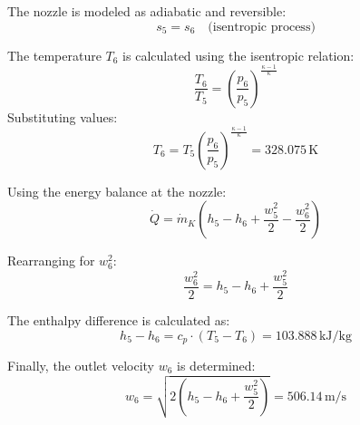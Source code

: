 The nozzle is modeled as adiabatic and reversible:  
\[
s_5 = s_6 \quad \text{(isentropic process)}  
\]  

The temperature \( T_6 \) is calculated using the isentropic relation:  
\[
\frac{T_6}{T_5} = \left( \frac{p_6}{p_5} \right)^{\frac{\kappa - 1}{\kappa}}  
\]  
Substituting values:  
\[
T_6 = T_5 \left( \frac{p_6}{p_5} \right)^{\frac{\kappa - 1}{\kappa}} = 328.075 \, \text{K}  
\]  

Using the energy balance at the nozzle:  
\[
\dot{Q} = \dot{m}_K \left( h_5 - h_6 + \frac{w_5^2}{2} - \frac{w_6^2}{2} \right)  
\]  

Rearranging for \( w_6^2 \):  
\[
\frac{w_6^2}{2} = h_5 - h_6 + \frac{w_5^2}{2}  
\]  

The enthalpy difference is calculated as:  
\[
h_5 - h_6 = c_p \cdot (T_5 - T_6) = 103.888 \, \text{kJ/kg}  
\]  

Finally, the outlet velocity \( w_6 \) is determined:  
\[
w_6 = \sqrt{2 \left( h_5 - h_6 + \frac{w_5^2}{2} \right)} = 506.14 \, \text{m/s}  
\]